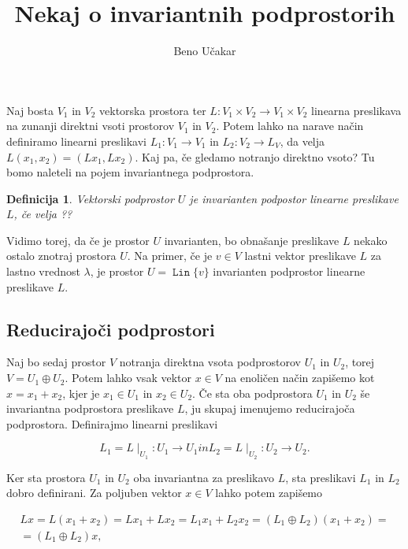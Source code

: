 \documentclass[a4paper,12pt]{article}
\newtheorem{definicija}{Definicija}
\DeclareMathOperator{\Lin}{\texttt{Lin}}
\begin{document}
\title{Nekaj o invariantnih podprostorih}
\author{Beno Učakar}
\date{}
\maketitle

Naj bosta $V_1$ in $V_2$ vektorska prostora ter $L \colon V_1 \times V_2 \to V_1 \times V_2$ linearna preslikava na zunanji direktni vsoti prostorov $V_1$ in $V_2$.
Potem lahko na narave način definiramo linearni preslikavi $L_1 \colon V_1 \to V_1$ in $L_2 \colon V_2 \to L_V$, da velja  
\(L(x_1, x_2) = (Lx_1, Lx_2).\)
Kaj pa, če gledamo notranjo direktno vsoto? Tu bomo naleteli na pojem invariantnega podprostora.

    \begin{definicija}
    Vektorski podprostor $U$ je \textit{invarianten podpostor} linearne preslikave $L$, če velja 
    ??
    \end{definicija}

Vidimo torej, da če je prostor $U$ invarianten, bo obnašanje preslikave $L$ nekako ostalo znotraj prostora $U$.
Na primer, če je $v \in V$ lastni vektor preslikave $L$ za lastno vrednost $\lambda$, je prostor 
\(U = \Lin \{ v \}\) invarianten podprostor linearne preslikave $L$.

\subsection*{Reducirajoči podprostori}

Naj bo sedaj prostor $V$ notranja direktna vsota podprostorov $U_1$ in $U_2$, torej $V = U_1 \oplus U_2$.
Potem lahko vsak vektor $x \in V$ na enoličen način zapišemo kot $x = x_1 + x_2$, kjer je $x_1 \in U_1$ in $x_2 \in U_2$.
Če sta oba podprostora $U_1$ in $U_2$ še invariantna podprostora preslikave $L$, ju skupaj imenujemo reducirajoča podprostora.
Definirajmo linearni preslikavi 

\[L_1 = L\mid_{U_1} \colon U_1 \to U_1  in  L_2 = L\mid_{U_2} \colon U_2 \to U_2.\]

Ker sta prostora $U_1$ in $U_2$ oba invariantna za preslikavo $L$, sta preslikavi $L_1$ in $L_2$ dobro definirani.
Za poljuben vektor $x \in V$ lahko potem zapišemo 

\begin{multline*}
    Lx = L(x_1 + x_2) = Lx_1+ Lx_2 = L_1x_1 + L_2x_2 = (L_1 \oplus L_2)(x_1 + x_2) = \\ 
    = (L_1 \oplus L_2)x,
\end{multline*}
\end{document}
